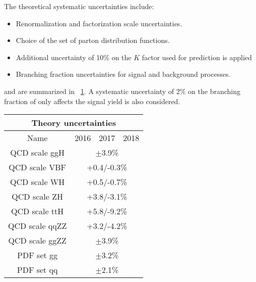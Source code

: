 The theoretical systematic uncertainties include:
\begin{itemize}
	\item Renormalization and factorization scale uncertainties. %
	\item Choice of the set of parton distribution functions. %
	\item Additional uncertainty of 10\% on the $K$ factor used for \ggzzfourl prediction is applied
	\item Branching fraction uncertainties for signal and background processes. %
\end{itemize}
and are summarized in \tablename~\ref{table:theo_syst}.
A systematic uncertainty of 2\% on the branching fraction of \hzzfourl only affects the signal yield is also considered. 
\begin{table}[ht]	
	\begin{center}
		\begin{tabular}{cccc}
		\hline
		\multicolumn{4}{c}{Theory uncertainties} \\
		\hline
		Name & 2016 & 2017 & 2018 \\
		\hline
		\hline
		QCD scale ggH	& \multicolumn{3}{c}{$\pm$3.9\%} \\
		QCD scale VBF	& \multicolumn{3}{c}{+0.4/-0.3\%} \\
		QCD scale WH	& \multicolumn{3}{c}{+0.5/-0.7\%} \\
		QCD scale ZH	& \multicolumn{3}{c}{+3.8/-3.1\%} \\
		QCD scale ttH	& \multicolumn{3}{c}{+5.8/-9.2\%} \\
		\hline
		\hline
		QCD scale qqZZ	& \multicolumn{3}{c}{+3.2/-4.2\%} \\
		QCD scale ggZZ	& \multicolumn{3}{c}{$\pm$3.9\%} \\
		\hline
		\hline
		PDF set gg	& \multicolumn{3}{c}{$\pm$3.2\%} \\
		PDF set qq	& \multicolumn{3}{c}{$\pm$2.1\%} \\
		\hline
		\end{tabular}
		\label{table:theo_syst}
	\end{center}
\end{table}
